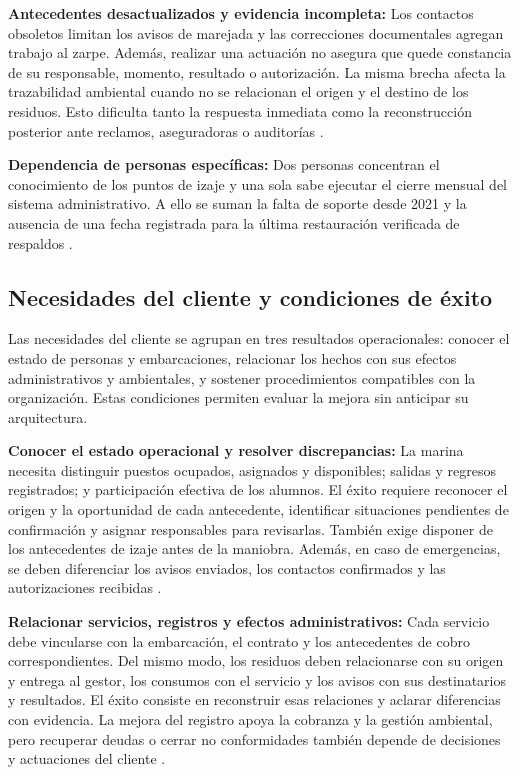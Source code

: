 \textbf{Antecedentes desactualizados y evidencia incompleta:}
Los contactos obsoletos limitan los avisos de marejada y las correcciones documentales agregan trabajo al zarpe. Además, realizar una actuación no asegura que quede constancia de su responsable, momento, resultado o autorización. La misma brecha afecta la trazabilidad ambiental cuando no se relacionan el origen y el destino de los residuos. Esto dificulta tanto la respuesta inmediata como la reconstrucción posterior ante reclamos, aseguradoras o auditorías \parencite[cap.~4, seccs.~4.3, 4.5 y 4.7, pp.~10-11]{pucv-caso07-2026}.

\textbf{Dependencia de personas específicas:}
Dos personas concentran el conocimiento de los puntos de izaje y una sola sabe ejecutar el cierre mensual del sistema administrativo. A ello se suman la falta de soporte desde 2021 y la ausencia de una fecha registrada para la última restauración verificada de respaldos \parencite[cap.~4, secc.~4.6, p.~11; caps.~5-6, pp.~13-15]{pucv-caso07-2026}.



\subsection{Necesidades del cliente y condiciones de éxito} %

Las necesidades del cliente se agrupan en tres resultados operacionales: conocer el estado de personas y embarcaciones, relacionar los hechos con sus efectos administrativos y ambientales, y sostener procedimientos compatibles con la organización. Estas condiciones permiten evaluar la mejora sin anticipar su arquitectura.

\textbf{Conocer el estado operacional y resolver discrepancias:}
La marina necesita distinguir puestos ocupados, asignados y disponibles; salidas y regresos registrados; y participación efectiva de los alumnos. El éxito requiere reconocer el origen y la oportunidad de cada antecedente, identificar situaciones pendientes de confirmación y asignar responsables para revisarlas. También exige disponer de los antecedentes de izaje antes de la maniobra. Además, en caso de emergencias, se deben diferenciar los avisos enviados, los contactos confirmados y las autorizaciones recibidas \parencite[cap.~4, seccs.~4.1, 4.4-4.6 y 4.9, pp.~9-12; cap.~18, criterio~14, p.~44]{pucv-caso07-2026}.

\textbf{Relacionar servicios, registros y efectos administrativos:}
Cada servicio debe vincularse con la embarcación, el contrato y los antecedentes de cobro correspondientes. Del mismo modo, los residuos deben relacionarse con su origen y entrega al gestor, los consumos con el servicio y los avisos con sus destinatarios y resultados. El éxito consiste en reconstruir esas relaciones y aclarar diferencias con evidencia. La mejora del registro apoya la cobranza y la gestión ambiental, pero recuperar deudas o cerrar no conformidades también depende de decisiones y actuaciones del cliente \parencite[cap.~4, seccs.~4.5, 4.7 y 4.11-4.12, pp.~10-13]{pucv-caso07-2026}.

